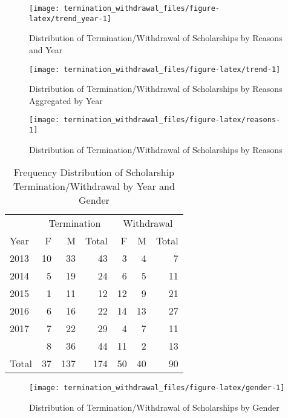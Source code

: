 \documentclass[a4paper]{article}
\begin{document}
\begin{figure}

{\centering \texttt{[image: termination\_withdrawal\_files/figure-latex/trend\_year-1]} 

}

\caption{\label{trend_year}Distribution of Termination/Withdrawal of Scholarships by Reasons and Year}\label{fig:trend_year}
\end{figure}

\begin{figure}

{\centering \texttt{[image: termination\_withdrawal\_files/figure-latex/trend-1]} 

}

\caption{\label{trend}Distribution of Termination/Withdrawal of Scholarships by Reasons Aggregated by Year}\label{fig:trend}
\end{figure}

\begin{figure}

{\centering \texttt{[image: termination\_withdrawal\_files/figure-latex/reasons-1]} 

}

\caption{\label{reasons}Distribution of Termination/Withdrawal of Scholarships by Reasons}\label{fig:reasons}
\end{figure}

\begin{table}

\caption{\label{tab:unnamed-chunk-6}\label{tab:2}Frequency Distribution of Scholarship Termination/Withdrawal by Year and Gender}
\centering
\begin{tabular}[t]{lrrrrrr}
\toprule
\multicolumn{1}{c}{ } & \multicolumn{3}{c}{Termination} & \multicolumn{3}{c}{Withdrawal} \\
\cmidrule(l{2pt}r{2pt}){2-4} \cmidrule(l{2pt}r{2pt}){5-7}
Year & F & M & Total & F & M & Total\\
\midrule
2013 & 10 & 33 & 43 & 3 & 4 & 7\\
2014 & 5 & 19 & 24 & 6 & 5 & 11\\
2015 & 1 & 11 & 12 & 12 & 9 & 21\\
2016 & 6 & 16 & 22 & 14 & 13 & 27\\
2017 & 7 & 22 & 29 & 4 & 7 & 11\\
\addlinespace
2018 & 8 & 36 & 44 & 11 & 2 & 13\\
Total & 37 & 137 & 174 & 50 & 40 & 90\\
\bottomrule
\end{tabular}
\end{table}
\begin{figure}

{\centering \texttt{[image: termination\_withdrawal\_files/figure-latex/gender-1]} 

}

\caption{\label{gender}Distribution of Termination/Withdrawal of Scholarships by Gender}\label{fig:gender}
\end{figure}
\end{document}
